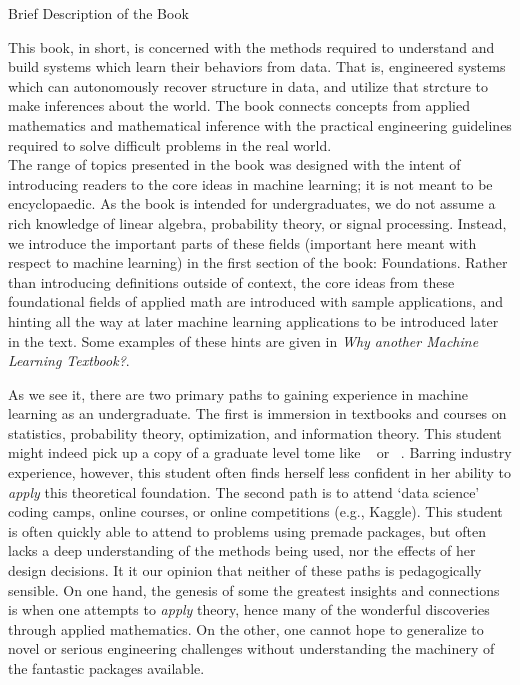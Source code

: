\documentclass[10pt]{article}
\newenvironment{changemargin}[2]{%
\begin{list}{}{%
\setlength{\topsep}{0pt}%
\setlength{\leftmargin}{#1}%
\setlength{\rightmargin}{#2}%
\setlength{\listparindent}{\parindent}%
\setlength{\itemindent}{\parindent}%
\setlength{\parsep}{\parskip}%
}%
\item[]}{\end{list}}
\renewcommand{\it}{\textit}
\begin{document}
\begin{changemargin}{+-1cm}{-3cm}
\vspace{1cm}
\noindent
\large{Brief Description of the Book}\\
\small

This book, in short, is concerned with the methods required to understand and build systems which learn their behaviors from data. That is, engineered systems which can autonomously recover structure in data, and utilize that strcture to make inferences about the world. The book connects concepts from applied mathematics and mathematical inference with the practical engineering guidelines required to solve difficult problems in the real world. \\

The range of topics presented in the book was designed with the intent of introducing readers to the core ideas in machine learning; it is not meant to be encyclopaedic. As the book is intended for undergraduates, we do not assume a rich knowledge of linear algebra, probability theory, or signal processing. Instead, we introduce the important parts of these fields (important here meant with respect to machine learning) in the first section of the book: Foundations. Rather than introducing definitions outside of context, the core ideas from these foundational fields of applied math are introduced with sample applications, and hinting all the way at later machine learning applications to be introduced later in the text. Some examples of these hints are given in \it{Why another Machine Learning Textbook?}.

As we see it, there are two primary paths to gaining experience in machine learning as an undergraduate. The first is immersion in textbooks and courses on statistics, probability theory, optimization, and information theory. This student might indeed pick up a copy of a graduate level tome like ~\cite{murphy2012machine} or ~\cite{bishop2016pattern}. Barring industry experience, however, this student often finds herself less confident in her ability to \it{apply} this theoretical foundation. The second path is to attend `data science' coding camps, online courses, or online competitions (e.g., Kaggle). This student is often quickly able to attend to problems using premade packages, but often lacks a deep understanding of the methods being used, nor the effects of her design decisions. It it our opinion that neither of these paths is pedagogically sensible. On one hand, the genesis of some the greatest insights and connections is when one attempts to \it{apply} theory, hence many of the wonderful discoveries through applied mathematics. On the other, one cannot hope to generalize to novel or serious engineering challenges without understanding the machinery of the fantastic packages available. \\


\end{changemargin}
\end{document}
